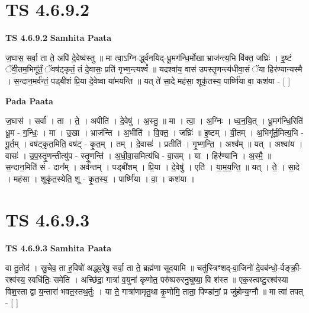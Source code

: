 \documentclass[17pt]{extarticle}
\begin{document}

\section{ TS 4.6.9.2 }

\textbf{TS 4.6.9.2 } \newline
\textbf{Samhita Paata} \newline

ज॒घास॒ सर्वा॒ ता ते॒ अपि॑ दे॒वेष्व॑स्तु ॥ मा त्वा॒ऽग्नि-र्द्ध्व॑नयिद्-धू॒मग॑न्धि॒र्मोखा भ्राज॑न्त्य॒भि वि॑क्त॒ जघ्रिः॑ । इ॒ष्टं ॅवी॒तम॒भिगू᳚र्तं॒ ॅवष॑ट्कृतं॒ तं दे॒वासः॒ प्रति॑ गृभ्ण॒न्त्यश्वं᳚ ॥ यदश्वा॑य॒ वास॑ उपस्तृ॒णन्त्य॑धीवा॒सं ॅया हिर॑ण्यान्यस्मै । स॒न्दान॒मर्व॑न्तं॒ पड्बी॑शं प्रि॒या दे॒वेष्वा या॑मयन्ति ॥ यत् ते॑ सा॒दे मह॑सा॒ शूकृ॑तस्य॒ पार्ष्णि॑या वा॒ कश॑या - [  ] \newline

\textbf{Pada Paata} \newline

ज॒घास॑ । सर्वा᳚ । ता । ते॒ । अपीति॑ । दे॒वेषु॑ । अ॒स्तु॒ ॥ मा । त्वा॒ । अ॒ग्निः । ध्व॒न॒यि॒त् । धू॒मग॑न्धि॒रिति॑ धू॒म - ग॒न्धिः॒ । मा । उ॒खा । भ्राज॑न्ति । अ॒भीति॑ । वि॒क्त॒ । जघ्रिः॑ ॥ इ॒ष्टम् । वी॒तम् । अ॒भिगू᳚र्त॒मित्य॒भि - गू॒र्त॒म् । वष॑ट्कृत॒मिति॒ वष॑ट् - कृ॒त॒म् । तम् । दे॒वासः॑ । प्रतीति॑ । गृ॒भ्ण॒न्ति॒ । अश्व᳚म् ॥ यत् । अश्वा॑य । वासः॑ । उ॒प॒स्तृ॒णन्तीत्यु॑प - स्तृ॒णन्ति॑ । अ॒धी॒वा॒समित्य॑धि - वा॒सम् । या । हिर॑ण्यानि । अ॒स्मै॒ ॥ स॒न्दान॒मिति॑ सं - दान᳚म् । अर्व॑न्तम् । पड्बी॑शम् । प्रि॒या । दे॒वेषु॑ । एति॑ । या॒म॒य॒न्ति॒ ॥ यत् । ते॒ । सा॒दे । मह॑सा । शूकृ॑त॒स्येति॒ शू - कृ॒त॒स्य॒ । पार्ष्णि॑या । वा॒ । कश॑या ।  \newline





\section{ TS 4.6.9.3 }

\textbf{TS 4.6.9.3 } \newline
\textbf{Samhita Paata} \newline

वा तु॒तोद॑ । स्रु॒चेव॒ ता ह॒विषो॑ अद्ध्व॒रेषु॒ सर्वा॒ ता ते॒ ब्रह्म॑णा सूदयामि ॥ चतु॑स्त्रिꣳशद्-वा॒जिनो॑ दे॒वब॑न्धो॒-र्वङ्क्री॒-रश्व॑स्य॒ स्वधि॑तिः॒ समे॑ति । अच्छि॑द्रा॒ गात्रा॑ व॒युना॑ कृणोत॒ परु॑ष्परुरनु॒घुष्या॒ वि श॑स्त ॥ एक॒स्त्वष्टु॒रश्व॑स्या विश॒स्ता द्वा य॒न्तारा॑ भवत॒स्तथ॒र्तुः । या ते॒ गात्रा॑णामृतु॒था कृ॒णोमि॒ ताता॒ पिण्डा॑नां॒ प्र जु॑होम्य॒ग्नौ ॥ मा त्वा॑ तपत् - [  ] \newline
\end{document}
